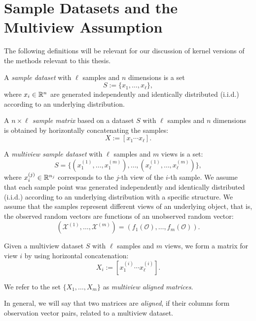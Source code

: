 \section{Sample Datasets and the Multiview Assumption}
The following definitions will be relevant for our discussion of kernel versions of the methods relevant to this thesis.

\begin{definition}\label{def:notation:sample_dataset}
A \emph{sample dataset} with $\ell$ samples and $n$ dimensions is a set
$$ S := \lbrace x_1, \ldots, x_\ell \rbrace, $$
 where $x_i \in \mathbb{R}^n$ are  generated independently and identically distributed (i.i.d.) according to
an underlying distribution.
\end{definition}

\begin{definition}\label{def:notation:sample_matrix}
A \emph{$n\times\ell$ sample matrix} based on a dataset $S$ with $\ell$ samples and $n$ dimensions is obtained by horizontally concatenating the samples:
$$ X := \left[ x_1 \cdots x_\ell \right]. $$
\end{definition}

\begin{definition}\label{def:notation:multiview_dataset}
A \emph{multiview sample dataset} with $\ell$ samples and $m$ views is a set:
$$ S = \big\{ \left( x_1^{(1)},\ldots, x_1^{(m)} \right), \ldots, \left( x_\ell^{(1)}, \ldots, x_\ell^{(m)} \right) \big\}, $$
where $x_i^{(j)} \in \mathbb{R}^{n_j}$ corresponds to the $j$-th view of the $i$-th sample.
We assume that each sample point was generated independently and identically distributed (i.i.d.)
according to an underlying distribution with a specific structure.
We assume that the samples represent different views of an underlying object, that is, the observed random vectors
are functions of an unobserved random vector:
  $$ \left( \mathcal{X}^{(1)}, \ldots, \mathcal{X}^{(m)} \right) = \left( f_1(\mathcal{O}), \ldots, f_m(\mathcal{O}) \right).$$
\end{definition}

\begin{definition}\label{def:notation:multiview_aligned_matrices}
Given a multiview dataset $S$ with $\ell$ samples and $m$ views,
we form a matrix for view $i$ by using horizontal concatenation:
$$ X_i := \left[ x_1^{(i)} \cdots x_\ell^{(i)} \right]. $$

We refer to the set $\{ X_1, \ldots, X_m \}$ as \emph{multiview aligned matrices}.

In general, we will say that two matrices are \emph{aligned}, if their columns form observation vector pairs, related to a multiview dataset.
\end{definition}

